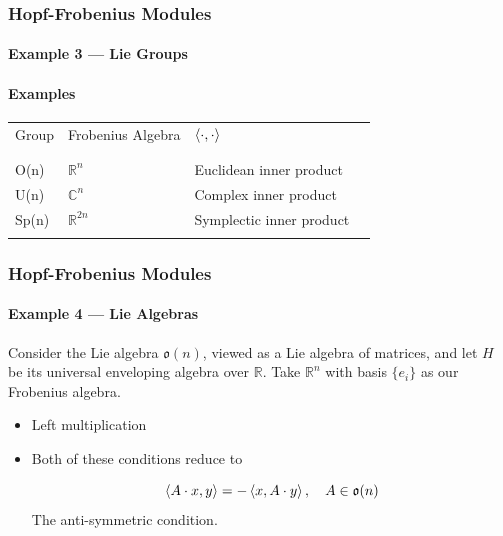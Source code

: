 \documentclass{beamer}
\begin{document}
\begin{frame}

\frametitle{Hopf-Frobenius Modules}
\framesubtitle{Example 3 --- Lie Groups}

\framesubtitle{Examples}

\begin{tabularx}{\textwidth}{lll>{\raggedright\arraybackslash}X}
\toprule
Group & Frobenius Algebra & $\left\langle \cdot, \cdot \right\rangle$ \\
\\
\midrule
\\
O(n) & $\mathbb{R}^n$ & Euclidean inner product \\
 U(n) & $\mathbb{C}^n$  & Complex inner product \\
 Sp(n) & $\mathbb{R}^{2n}$ & Symplectic inner product \\
\\
\bottomrule
\end{tabularx}





\end{frame}

\begin{frame}

\frametitle{Hopf-Frobenius Modules}
\framesubtitle{Example 4 --- Lie Algebras}


Consider the Lie algebra $\mathfrak{o}(n)$, viewed as a Lie algebra of matrices, and let $H$ be its universal enveloping algebra over $\mathbb{R}$. Take $\mathbb{R}^n$ with basis $\{ e_i \}$ as our Frobenius algebra.

\bigskip

\begin{itemize}

\item {} Left multiplication


\medskip

\item {} Both of these conditions reduce to

\begin{equation*}
\left\langle A \cdot x, y \right\rangle = - \left\langle x,A \cdot y \right\rangle, \quad A \in \mathfrak{o}(n)
\end{equation*}
The anti-symmetric condition.

\end{itemize}




\end{frame}
\end{document}
